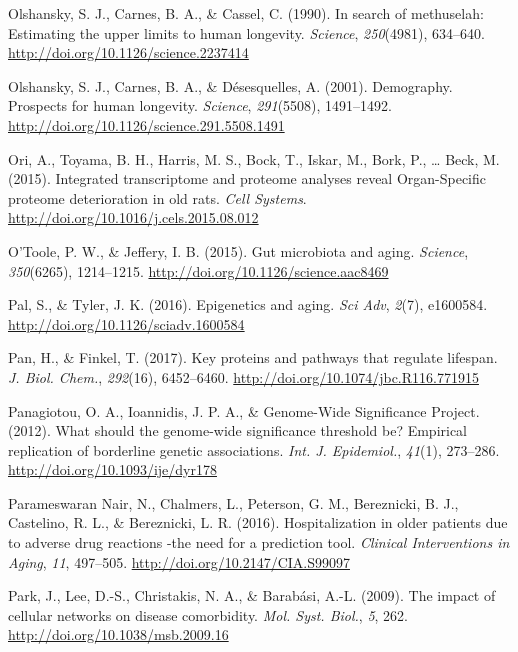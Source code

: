 \documentclass[12pt,twoside]{unicam}
\begin{document}
\begin{cslreferences}
\leavevmode\hypertarget{ref-Olshansky1990}{}%
Olshansky, S. J., Carnes, B. A., \& Cassel, C. (1990). In search of methuselah: Estimating the upper limits to human longevity. \emph{Science}, \emph{250}(4981), 634--640. \url{http://doi.org/10.1126/science.2237414}

\leavevmode\hypertarget{ref-Olshansky2001}{}%
Olshansky, S. J., Carnes, B. A., \& Désesquelles, A. (2001). Demography. Prospects for human longevity. \emph{Science}, \emph{291}(5508), 1491--1492. \url{http://doi.org/10.1126/science.291.5508.1491}

\leavevmode\hypertarget{ref-Ori2015}{}%
Ori, A., Toyama, B. H., Harris, M. S., Bock, T., Iskar, M., Bork, P., \ldots{} Beck, M. (2015). Integrated transcriptome and proteome analyses reveal Organ-Specific proteome deterioration in old rats. \emph{Cell Systems}. \url{http://doi.org/10.1016/j.cels.2015.08.012}

\leavevmode\hypertarget{ref-OToole2015}{}%
O'Toole, P. W., \& Jeffery, I. B. (2015). Gut microbiota and aging. \emph{Science}, \emph{350}(6265), 1214--1215. \url{http://doi.org/10.1126/science.aac8469}

\leavevmode\hypertarget{ref-Pal2016}{}%
Pal, S., \& Tyler, J. K. (2016). Epigenetics and aging. \emph{Sci Adv}, \emph{2}(7), e1600584. \url{http://doi.org/10.1126/sciadv.1600584}

\leavevmode\hypertarget{ref-Pan2017}{}%
Pan, H., \& Finkel, T. (2017). Key proteins and pathways that regulate lifespan. \emph{J. Biol. Chem.}, \emph{292}(16), 6452--6460. \url{http://doi.org/10.1074/jbc.R116.771915}

\leavevmode\hypertarget{ref-Panagiotou2012}{}%
Panagiotou, O. A., Ioannidis, J. P. A., \& Genome-Wide Significance Project. (2012). What should the genome-wide significance threshold be? Empirical replication of borderline genetic associations. \emph{Int. J. Epidemiol.}, \emph{41}(1), 273--286. \url{http://doi.org/10.1093/ije/dyr178}

\leavevmode\hypertarget{ref-ParameswaranNair2016}{}%
Parameswaran Nair, N., Chalmers, L., Peterson, G. M., Bereznicki, B. J., Castelino, R. L., \& Bereznicki, L. R. (2016). Hospitalization in older patients due to adverse drug reactions -the need for a prediction tool. \emph{Clinical Interventions in Aging}, \emph{11}, 497--505. \url{http://doi.org/10.2147/CIA.S99097}

\leavevmode\hypertarget{ref-Park2009}{}%
Park, J., Lee, D.-S., Christakis, N. A., \& Barabási, A.-L. (2009). The impact of cellular networks on disease comorbidity. \emph{Mol. Syst. Biol.}, \emph{5}, 262. \url{http://doi.org/10.1038/msb.2009.16}


\end{cslreferences}
\end{document}
